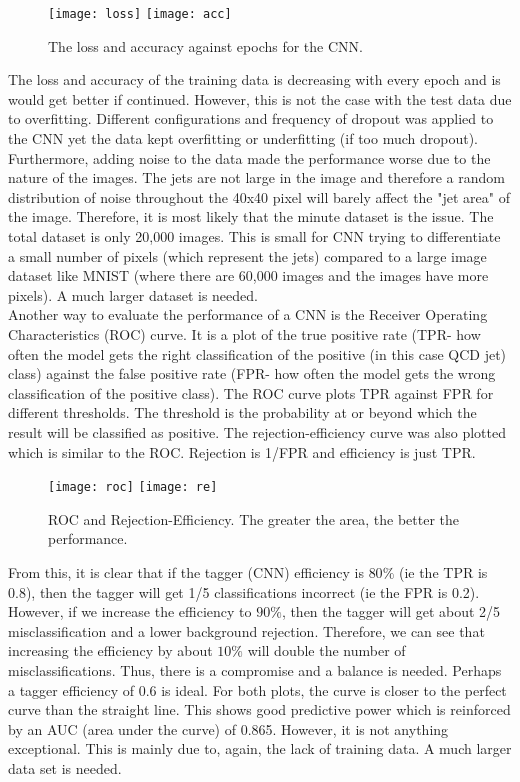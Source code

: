 \documentclass[11pt, a4page]{article}
\begin{document}
\begin{figure}[!ht]
    \centering
    \texttt{[image: loss]}
    \texttt{[image: acc]}
    \caption{The loss and accuracy against epochs for the CNN.}
    \label{nothing}
\end{figure}

The loss and accuracy of the training data is decreasing with every epoch and is would get better if continued. However, this is not the case with the test data due to overfitting. Different configurations and frequency of dropout was applied to the CNN yet the data kept overfitting or underfitting (if too much dropout). Furthermore, adding noise to the data made the performance worse due to the nature of the images. The jets are not large in the image and therefore a random distribution of noise throughout the 40x40 pixel will barely affect the "jet area" of the image.
Therefore, it is most likely that the minute dataset is the issue. The total dataset is only 20,000 images. This is small for CNN trying to differentiate a small number of pixels (which represent the jets) compared to a large image dataset like MNIST (where there are 60,000 images and the images have more pixels). A much larger dataset is needed.
\\
Another way to evaluate the performance of a CNN is the Receiver Operating Characteristics (ROC) curve. It is a plot of the true positive rate (TPR- how often the model gets the right classification of the positive (in this case QCD jet) class) against the false positive rate (FPR- how often the model gets the wrong classification of the positive class). The ROC curve plots TPR against FPR for different thresholds. The threshold is the probability at or beyond which the result will be classified as positive. The rejection-efficiency curve was also plotted which is similar to the ROC. Rejection is  1/FPR and efficiency is just TPR. 
\begin{figure}[!ht]
    \centering
    \texttt{[image: roc]}
    \texttt{[image: re]}
    \caption{ROC and Rejection-Efficiency. The greater the area, the better the performance. }
    \label{nothing}
\end{figure}

From this, it is clear that if the tagger (CNN) efficiency is $80\%$ (ie the TPR is 0.8), then the tagger will get 1/5 classifications incorrect (ie the FPR is 0.2). However, if we increase the efficiency to $90\%$, then the tagger will get about 2/5 misclassification and a lower background rejection. Therefore, we can see that increasing the efficiency by about $10\%$ will double the number of misclassifications. Thus, there is a compromise and a balance is needed. Perhaps a tagger efficiency of 0.6 is ideal.  For both plots, the curve is closer to the perfect curve than the straight line. This shows good predictive power which is reinforced by an AUC (area under the curve) of 0.865. However, it is not anything exceptional. This is mainly due to, again, the lack of training data. A much larger data set is needed.
\end{document}
